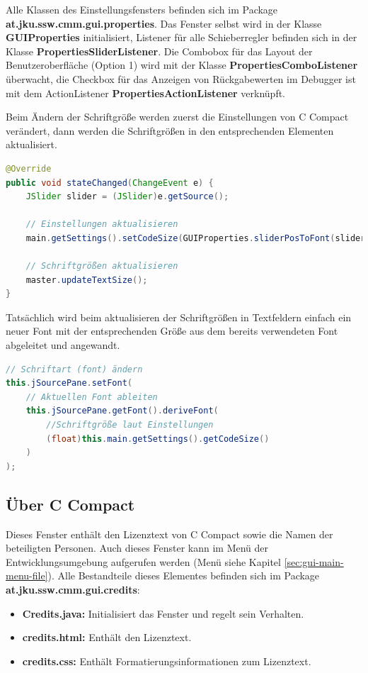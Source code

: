 Alle Klassen des Einstellungsfensters befinden sich im Package \textbf{at.jku.ssw.cmm.gui.properties}. Das Fenster selbst wird in der Klasse \textbf{GUIProperties} initialisiert, Listener für alle Schieberregler befinden sich in der Klasse \textbf{PropertiesSliderListener}. Die Combobox für das Layout der Benutzeroberfläche (Option 1) wird mit der Klasse \textbf{PropertiesComboListener} überwacht, die Checkbox für das Anzeigen von Rückgabewerten im Debugger ist mit dem ActionListener \textbf{PropertiesActionListener} verknüpft.

Beim Ändern der Schriftgröße werden zuerst die Einstellungen von C Compact verändert, dann werden die Schriftgrößen in den entsprechenden Elementen aktualisiert.
\begin{lstlisting}[language=JAVA]
@Override
public void stateChanged(ChangeEvent e) {
	JSlider slider = (JSlider)e.getSource();
	
	// Einstellungen aktualisieren
	main.getSettings().setCodeSize(GUIProperties.sliderPosToFont(slider.getValue()));
	
	// Schriftgrößen aktualisieren
	master.updateTextSize();
}
\end{lstlisting}

Tatsächlich wird beim aktualisieren der Schriftgrößen in Textfeldern einfach ein neuer Font mit der entsprechenden Größe aus dem bereits verwendeten Font abgeleitet und angewandt.
\begin{lstlisting}[language=JAVA]
// Schriftart (font) ändern
this.jSourcePane.setFont(
	// Aktuellen Font ableiten
	this.jSourcePane.getFont().deriveFont(
		//Schriftgröße laut Einstellungen
		(float)this.main.getSettings().getCodeSize()
	)
);
\end{lstlisting}

\subsection{Über C Compact}
\label{sec:win-credits}
Dieses Fenster enthält den Lizenztext von C Compact sowie die Namen der beteiligten Personen. Auch dieses Fenster kann im Menü der Entwicklungsumgebung aufgerufen werden (Menü siehe Kapitel \ref{sec:gui-main-menu-file}). Alle Bestandteile dieses Elementes befinden sich im Package \textbf{at.jku.ssw.cmm.gui.credits}:
\begin{itemize}
\item \textbf{Credits.java:} Initialisiert das Fenster und regelt sein Verhalten.
\item \textbf{credits.html:} Enthält den Lizenztext.
\item \textbf{credits.css:} Enthält Formatierungsinformationen zum Lizenztext.
\end{itemize}

